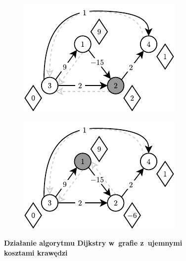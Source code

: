 \begin{figure}[!htbp]
\begin{subfigure}[b]{0.3\textwidth}
		\caption{}
	\end{subfigure}
	\begin{subfigure}[b]{0.3\textwidth}
		\includegraphics[width=\textwidth]{Chapter_II/DIJKSTRA-NegativeArc/d.pdf}
		\caption{}
	\end{subfigure}%
	\begin{subfigure}[b]{0.3\textwidth}
		\includegraphics[width=\textwidth]{Chapter_II/DIJKSTRA-NegativeArc/e.pdf}
		\caption{}
	\end{subfigure}
	\caption{\textbf{Działanie algorytmu Dijkstry w~grafie z~ujemnymi kosztami krawędzi}} \label{fig:exapleDijkstraNegativArc}
\end{figure}

